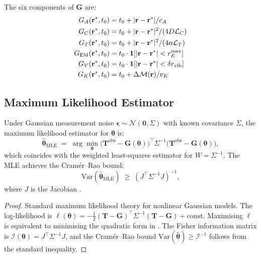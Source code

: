 \begin{definition}
The six components of $\mathbf{G}$ are:
\begin{align*}
    G_A(\mathbf{r}^*, t_0) &= t_0 + |\mathbf{r} - \mathbf{r}^*|/c_A \\
    G_C(\mathbf{r}^*, t_0) &= t_0 + |\mathbf{r} - \mathbf{r}^*|^2/(4D\mathcal{L}_C) \\
    G_T(\mathbf{r}^*, t_0) &= t_0 + |\mathbf{r} - \mathbf{r}^*|^2/(4\alpha\mathcal{L}_T) \\
    G_\mathrm{EM}(\mathbf{r}^*, t_0) &= t_0 \cdot \mathbf{1}[|\mathbf{r} - \mathbf{r}^*| < r_E^\mathrm{max}] \\
    G_V(\mathbf{r}^*, t_0) &= t_0 \cdot \mathbf{1}[|\mathbf{r} - \mathbf{r}^*| < \delta r_\mathrm{vib}] \\
    G_K(\mathbf{r}^*, t_0) &= t_0 + \Delta\mathcal{M}(\mathbf{r})/v_K
\end{align*}
\end{definition}

\subsection{Maximum Likelihood Estimator}

\begin{theorem}
\label{thm:mle-optimal}
Under Gaussian measurement noise $\boldsymbol{\epsilon} \sim \mathcal{N}(\mathbf{0},
\Sigma)$ with known covariance $\Sigma$, the maximum likelihood estimator
for $\boldsymbol{\theta}$ is:
\begin{equation}
    \hat{\boldsymbol{\theta}}_\mathrm{MLE}
    \;=\; \arg\min_{\boldsymbol{\theta}}
    \bigl(\mathbf{T}^\mathrm{obs} - \mathbf{G}(\boldsymbol{\theta})\bigr)^\top
    \Sigma^{-1}
    \bigl(\mathbf{T}^\mathrm{obs} - \mathbf{G}(\boldsymbol{\theta})\bigr),
    \label{eq:mle-optimal}
\end{equation}
which coincides with the weighted least-squares estimator 
for $W = \Sigma^{-1}$.  The MLE achieves the Cramér--Rao bound:
\begin{equation}
    \mathrm{Var}(\hat{\boldsymbol{\theta}}_\mathrm{MLE})
    \;\ge\; (J^\top \Sigma^{-1} J)^{-1},
\end{equation}
where $J$ is the Jacobian .
\end{theorem}

\begin{proof}
Standard maximum likelihood theory for nonlinear Gaussian models.  The
log-likelihood is $\ell(\boldsymbol{\theta}) = -\tfrac{1}{2}(\mathbf{T} -
\mathbf{G})^\top\Sigma^{-1}(\mathbf{T} - \mathbf{G}) + \mathrm{const}$.
Maximising $\ell$ is equivalent to minimising the quadratic form in
.  The Fisher information matrix is
$\mathcal{I}(\boldsymbol{\theta}) = J^\top\Sigma^{-1}J$, and the
Cramér--Rao bound $\mathrm{Var}(\hat{\boldsymbol{\theta}}) \ge
\mathcal{I}^{-1}$ follows from the standard inequality.
\end{proof}

